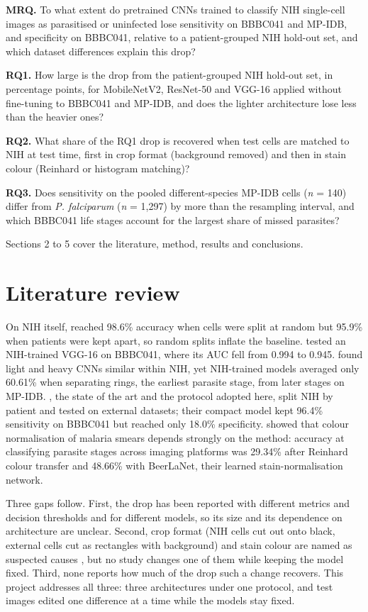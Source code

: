 \documentclass[11pt,a4paper]{article}
\begin{document}
\textbf{MRQ.} To what extent do pretrained CNNs trained to classify NIH single-cell images as parasitised or uninfected lose sensitivity on BBBC041 and MP-IDB, and specificity on BBBC041, relative to a patient-grouped NIH hold-out set, and which dataset differences explain this drop?

\textbf{RQ1.} How large is the drop from the patient-grouped NIH hold-out set, in percentage points, for \mbox{MobileNetV2}, ResNet-50 and VGG-16 applied without fine-tuning to BBBC041 and MP-IDB, and does the lighter architecture lose less than the heavier ones?

\textbf{RQ2.} What share of the RQ1 drop is recovered when test cells are matched to NIH at test time, first in crop format (background removed) and then in stain colour (Reinhard or histogram matching)?

\textbf{RQ3.} Does sensitivity on the pooled different-species MP-IDB cells (\emph{n} = 140) differ from \emph{P. falciparum} (\emph{n} = 1,297) by more than the resampling interval, and which BBBC041 life stages account for the largest share of missed parasites?

Sections 2 to 5 cover the literature, method, results and conclusions.

\section{Literature review}

On NIH itself, \citet{rajaraman2018} reached 98.6\% accuracy when cells were split at random but 95.9\% when patients were kept apart, so random splits inflate the baseline. \citet{zhao2020} tested an NIH-trained VGG-16 on BBBC041, where its AUC fell from 0.994 to 0.945. \citet{loddo2022} found light and heavy CNNs similar within NIH, yet NIH-trained models averaged only 60.61\% when separating rings, the earliest parasite stage, from later stages on MP-IDB. \citet{hou2026}, the state of the art and the protocol adopted here, split NIH by patient and tested on external datasets; their compact model kept 96.4\% sensitivity on BBBC041 but reached only 18.0\% specificity. \citet{xu2025} showed that colour normalisation of malaria smears depends strongly on the method: accuracy at classifying parasite stages across imaging platforms was 29.34\% after Reinhard colour transfer and 48.66\% with BeerLaNet, their learned stain-normalisation network.

Three gaps follow. First, the drop has been reported with different metrics and decision thresholds and for different models, so its size and its dependence on architecture are unclear. Second, crop format (NIH cells cut out onto black, external cells cut as rectangles with background) and stain colour are named as suspected causes \citep{zhao2020,loddo2022,hou2026}, but no study changes one of them while keeping the model fixed. Third, none reports how much of the drop such a change recovers. This project addresses all three: three architectures under one protocol, and test images edited one difference at a time while the models stay fixed.
\end{document}
